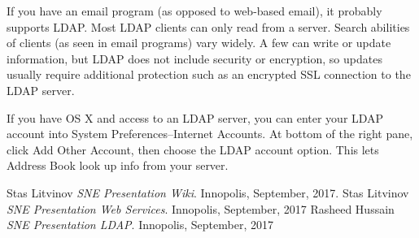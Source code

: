 \documentclass[12pt,a4paper]{report}
\begin{document}
	If you have an email program (as opposed to web-based email), it probably supports LDAP. Most LDAP clients can only read from a server. Search abilities of clients (as seen in email programs) vary widely. A few can write or update information, but LDAP does not include security or encryption, so updates usually require additional protection such as an encrypted SSL connection to the LDAP server.
	
	If you have OS X and access to an LDAP server, you can enter your LDAP account into System Preferences--Internet Accounts. At bottom of the right pane, click Add Other Account, then choose the LDAP account option. This lets Address Book look up info from your server.




	
	\begin{thebibliography}{0}
		 Stas Litvinov
		\emph{SNE Presentation Wiki}. Innopolis, September, 2017.
		 Stas Litvinov
		\emph{SNE Presentation Web Services}. Innopolis, September, 2017
		 Rasheed Hussain
		\emph{SNE Presentation LDAP}. Innopolis, September, 2017
		
	\end{thebibliography}
	
\end{document}

